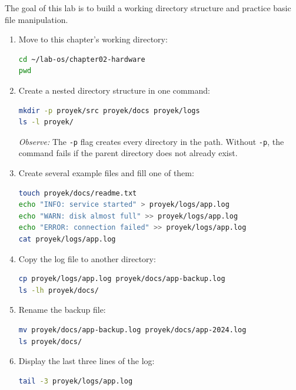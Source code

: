 The goal of this lab is to build a working directory structure and practice basic file manipulation.

\begin{enumerate}
    \item Move to this chapter's working directory:
\begin{lstlisting}[language=bash, caption={Entering the working directory}]
cd ~/lab-os/chapter02-hardware
pwd
\end{lstlisting}

    \item Create a nested directory structure in one command:
\begin{lstlisting}[language=bash, caption={Creating a directory structure}]
mkdir -p proyek/src proyek/docs proyek/logs
ls -l proyek/
\end{lstlisting}
    \textit{Observe:} The \texttt{-p} flag creates every directory in the path. Without \texttt{-p}, the command fails if the parent directory does not already exist.

    \item Create several example files and fill one of them:
\begin{lstlisting}[language=bash, caption={Creating and filling files}]
touch proyek/docs/readme.txt
echo "INFO: service started" > proyek/logs/app.log
echo "WARN: disk almost full" >> proyek/logs/app.log
echo "ERROR: connection failed" >> proyek/logs/app.log
cat proyek/logs/app.log
\end{lstlisting}

    \item Copy the log file to another directory:
\begin{lstlisting}[language=bash, caption={Copying a file}]
cp proyek/logs/app.log proyek/docs/app-backup.log
ls -lh proyek/docs/
\end{lstlisting}

    \item Rename the backup file:
\begin{lstlisting}[language=bash, caption={Renaming a file}]
mv proyek/docs/app-backup.log proyek/docs/app-2024.log
ls proyek/docs/
\end{lstlisting}

    \item Display the last three lines of the log:
\begin{lstlisting}[language=bash, caption={Reading the end of a log file}]
tail -3 proyek/logs/app.log
\end{lstlisting}
\end{enumerate}

